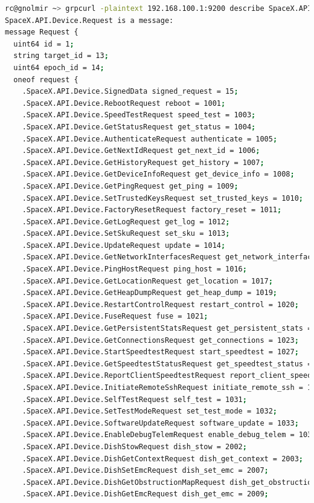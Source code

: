 \documentclass[IN,11pt,twoside,openright,idp,english]{tumthesis}
\begin{document}
\begin{lstlisting}[language=bash,basicstyle=\tiny]
rc@gnolmir ~> grpcurl -plaintext 192.168.100.1:9200 describe SpaceX.API.Device.Request
SpaceX.API.Device.Request is a message:
message Request {
  uint64 id = 1;
  string target_id = 13;
  uint64 epoch_id = 14;
  oneof request {
    .SpaceX.API.Device.SignedData signed_request = 15;
    .SpaceX.API.Device.RebootRequest reboot = 1001;
    .SpaceX.API.Device.SpeedTestRequest speed_test = 1003;
    .SpaceX.API.Device.GetStatusRequest get_status = 1004;
    .SpaceX.API.Device.AuthenticateRequest authenticate = 1005;
    .SpaceX.API.Device.GetNextIdRequest get_next_id = 1006;
    .SpaceX.API.Device.GetHistoryRequest get_history = 1007;
    .SpaceX.API.Device.GetDeviceInfoRequest get_device_info = 1008;
    .SpaceX.API.Device.GetPingRequest get_ping = 1009;
    .SpaceX.API.Device.SetTrustedKeysRequest set_trusted_keys = 1010;
    .SpaceX.API.Device.FactoryResetRequest factory_reset = 1011;
    .SpaceX.API.Device.GetLogRequest get_log = 1012;
    .SpaceX.API.Device.SetSkuRequest set_sku = 1013;
    .SpaceX.API.Device.UpdateRequest update = 1014;
    .SpaceX.API.Device.GetNetworkInterfacesRequest get_network_interfaces = 1015;
    .SpaceX.API.Device.PingHostRequest ping_host = 1016;
    .SpaceX.API.Device.GetLocationRequest get_location = 1017;
    .SpaceX.API.Device.GetHeapDumpRequest get_heap_dump = 1019;
    .SpaceX.API.Device.RestartControlRequest restart_control = 1020;
    .SpaceX.API.Device.FuseRequest fuse = 1021;
    .SpaceX.API.Device.GetPersistentStatsRequest get_persistent_stats = 1022;
    .SpaceX.API.Device.GetConnectionsRequest get_connections = 1023;
    .SpaceX.API.Device.StartSpeedtestRequest start_speedtest = 1027;
    .SpaceX.API.Device.GetSpeedtestStatusRequest get_speedtest_status = 1028;
    .SpaceX.API.Device.ReportClientSpeedtestRequest report_client_speedtest = 1029;
    .SpaceX.API.Device.InitiateRemoteSshRequest initiate_remote_ssh = 1030 [deprecated = true];
    .SpaceX.API.Device.SelfTestRequest self_test = 1031;
    .SpaceX.API.Device.SetTestModeRequest set_test_mode = 1032;
    .SpaceX.API.Device.SoftwareUpdateRequest software_update = 1033;
    .SpaceX.API.Device.EnableDebugTelemRequest enable_debug_telem = 1034;
    .SpaceX.API.Device.DishStowRequest dish_stow = 2002;
    .SpaceX.API.Device.DishGetContextRequest dish_get_context = 2003;
    .SpaceX.API.Device.DishSetEmcRequest dish_set_emc = 2007;
    .SpaceX.API.Device.DishGetObstructionMapRequest dish_get_obstruction_map = 2008;
    .SpaceX.API.Device.DishGetEmcRequest dish_get_emc = 2009;

\end{lstlisting}
\end{document}
